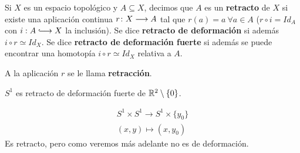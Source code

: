 \documentclass[GTS.tex]{subfiles}
\begin{document}
\begin{defi} Si $X$ es un espacio topológico y $A\subseteq X$, decimos que $A$ es un \textbf{retracto} de $X$ si existe una aplicación continua $r\colon{X}\longrightarrow{A}$ tal que $r(a)=a\ \forall a\in A$ ($r\circ i=Id_A$ con $i:A\longhookarrow X$ la inclusión). Se dice \textbf{retracto de deformación} si además $i\circ r\simeq Id_X$. Se dice \textbf{retracto de deformación fuerte} si además se puede encontrar una homotopía $i\circ r\simeq Id_X$ relativa a $A$.
\end{defi}

\begin{nota} A la aplicación $r$ se le llama \textbf{retracción}.
\end{nota}

\begin{consec} $S^1$ es retracto de deformación fuerte de $\mathbb{R}^2\setminus\{0\}$.
\end{consec}

\begin{ej}
\begin{gather*}
S^1\times S^1\longrightarrow S^1\times\{y_0\}\\
(x,y)\longmapsto (x,y_0)
\end{gather*}
Es retracto, pero como veremos más adelante no es de deformación.
\end{ej}
\end{document}

